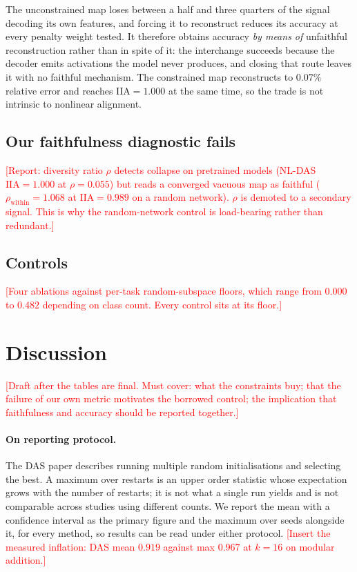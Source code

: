 \documentclass[11pt]{article}
\newcommand{\IIA}{\mathrm{IIA}}
\newcommand{\TODO}[1]{\textcolor{red}{[#1]}}
\begin{document}
The unconstrained map loses between a half and three quarters of the signal
decoding its own features, and forcing it to reconstruct reduces its accuracy at
every penalty weight tested. It therefore obtains accuracy \emph{by means of}
unfaithful reconstruction rather than in spite of it: the interchange succeeds
because the decoder emits activations the model never produces, and closing that
route leaves it with no faithful mechanism. The constrained map reconstructs to
$0.07\%$ relative error and reaches $\IIA = 1.000$ at the same time, so the trade
is not intrinsic to nonlinear alignment.

\subsection{Our faithfulness diagnostic fails}

\TODO{Report: diversity ratio $\rho$ detects collapse on pretrained models
(NL-DAS $\IIA = 1.000$ at $\rho = 0.055$) but reads a converged vacuous map as
faithful ($\rho_\text{within} = 1.068$ at $\IIA = 0.989$ on a random network).
$\rho$ is demoted to a secondary signal. This is why the random-network control is
load-bearing rather than redundant.}

\subsection{Controls}

\TODO{Four ablations against per-task random-subspace floors, which range from
$0.000$ to $0.482$ depending on class count. Every control sits at its floor.}

\section{Discussion}

\TODO{Draft after the tables are final. Must cover: what the constraints buy;
that the failure of our own metric motivates the borrowed control; the
implication that faithfulness and accuracy should be reported together.}

\paragraph{On reporting protocol.}
The DAS paper describes running multiple random initialisations and selecting the
best. A maximum over restarts is an upper order statistic whose expectation grows
with the number of restarts; it is not what a single run yields and is not
comparable across studies using different counts. We report the mean with a
confidence interval as the primary figure and the maximum over seeds alongside it,
for every method, so results can be read under either protocol.
\TODO{Insert the measured inflation: DAS mean $0.919$ against max $0.967$ at
$k=16$ on modular addition.}
\end{document}
